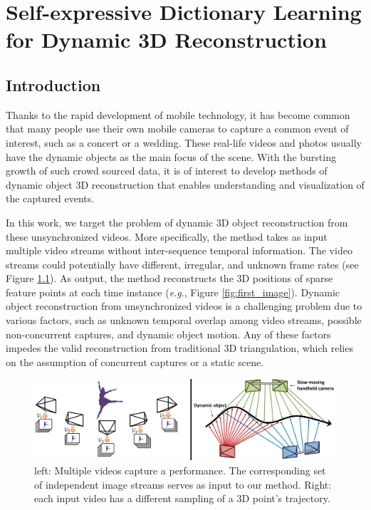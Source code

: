 \chapter{Self-expressive Dictionary Learning for Dynamic 3D Reconstruction} \label{ch:video_l1}

\section{Introduction}

Thanks to the rapid development of mobile technology, it has become common that many people use their own mobile cameras to capture a common event of interest, such as a concert or a wedding. These real-life videos and photos usually have the dynamic objects as the main focus of the scene. With the bursting growth of such crowd sourced data, it is of interest to develop methods of dynamic object 3D reconstruction that enables understanding and visualization of the captured events.

In this work, we target the problem of dynamic 3D object reconstruction from these unsynchronized videos. 
More specifically, the method takes as input multiple video streams without inter-sequence temporal information. The video streams could potentially have different, irregular, and unknown frame rates (see Figure \ref{fig:overview}). 
As output, the method reconstructs the 3D positions of sparse feature points at each time instance (\emph{e.g}., Figure \ref{fig:first_image}). 
Dynamic object reconstruction from unsynchronized videos is a challenging problem due to various factors, such as unknown temporal overlap among video streams, possible non-concurrent captures, and dynamic object motion. Any of these factors impedes the valid reconstruction from traditional 3D triangulation, which relies on the assumption of concurrent captures or a static scene.


\begin{figure}
\centering
\includegraphics[width=1\textwidth]{chapter5/resource/overview_1_cropped.pdf}
\caption[Illustration of the input for sparse reconstruction from unsynchronized videos.]{\label{fig:overview} left: Multiple videos capture a performance.
The corresponding set of independent image streams  serves as input to our method.
Right: each input video has a different sampling of a 3D point's trajectory.}
\end{figure}


